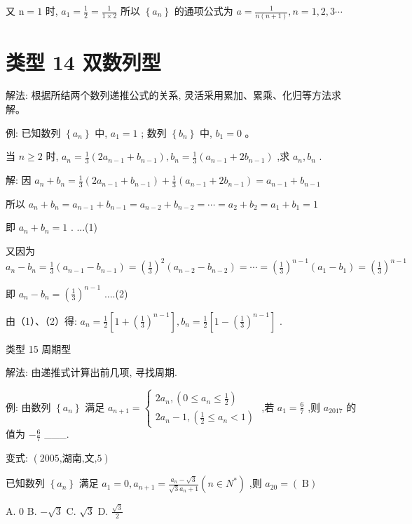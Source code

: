\documentclass[10pt,cn]{elegantbook}
\begin{document}
又 \(\mathrm{n} = 1\) 时, \({a}_{1} = \frac{1}{2} = \frac{1}{1 \times 2}\) 所以 \(\left\{ {a}_{n}\right\}\) 的通项公式为 \(a = \frac{1}{n\left( {n + 1}\right) },n = 1,2,3\cdots\)

\section*{类型 14 双数列型}

解法: 根据所结两个数列递推公式的关系, 灵活采用累加、累乘、化归等方法求解。

例: 已知数列 \(\left\{ {a}_{n}\right\}\) 中, \({a}_{1} = 1\) ; 数列 \(\left\{ {b}_{n}\right\}\) 中, \({b}_{1} = 0\) 。

当 \(n \geq 2\) 时, \({a}_{n} = \frac{1}{3}\left( {2{a}_{n - 1} + {b}_{n - 1}}\right) ,{b}_{n} = \frac{1}{3}\left( {{a}_{n - 1} + 2{b}_{n - 1}}\right)\) ,求 \({a}_{n},{b}_{n}\) .

解: 因 \({a}_{n} + {b}_{n} = \frac{1}{3}\left( {2{a}_{n - 1} + {b}_{n - 1}}\right) + \frac{1}{3}\left( {{a}_{n - 1} + 2{b}_{n - 1}}\right) = {a}_{n - 1} + {b}_{n - 1}\)

所以 \({a}_{n} + {b}_{n} = {a}_{n - 1} + {b}_{n - 1} = {a}_{n - 2} + {b}_{n - 2} = \cdots = {a}_{2} + {b}_{2} = {a}_{1} + {b}_{1} = 1\)

即 \({a}_{n} + {b}_{n} = 1\) . ...(1)

又因为 \({a}_{n} - {b}_{n} = \frac{1}{3}\left( {{a}_{n - 1} - {b}_{n - 1}}\right) = {\left( \frac{1}{3}\right) }^{2}\left( {{a}_{n - 2} - {b}_{n - 2}}\right) = \cdots = {\left( \frac{1}{3}\right) }^{n - 1}\left( {{a}_{1} - {b}_{1}}\right) = {\left( \frac{1}{3}\right) }^{n - 1}\)

即 \({a}_{n} - {b}_{n} = {\left( \frac{1}{3}\right) }^{n - 1}\) ....(2)

由（1）、（2）得: \({a}_{n} = \frac{1}{2}\left\lbrack {1 + {\left( \frac{1}{3}\right) }^{n - 1}}\right\rbrack ,{b}_{n} = \frac{1}{2}\left\lbrack {1 - {\left( \frac{1}{3}\right) }^{n - 1}}\right\rbrack\) .

类型 15 周期型

解法: 由递推式计算出前几项, 寻找周期.

例: 由数列 \(\left\{ {a}_{n}\right\}\) 满足 \({a}_{n + 1} = \left\{ \begin{array}{l} 2{a}_{n},\left( {0 \leq {a}_{n} \leq \frac{1}{2}}\right) \\ 2{a}_{n} - 1,\left( {\frac{1}{2} \leq {a}_{n} < 1}\right) \end{array}\right.\) ,若 \({a}_{1} = \frac{6}{7}\) ,则 \({a}_{2017}\) 的值为 \(- \frac{6}{7}\) \_\_\_.

变式: \(\left( {{2005}\text{,湖南,文,5}}\right)\)

已知数列 \(\left\{ {a}_{n}\right\}\) 满足 \({a}_{1} = 0,{a}_{n + 1} = \frac{{a}_{n} - \sqrt{3}}{\sqrt{3}{a}_{n} + 1}\left( {n \in {N}^{ * }}\right)\) ,则 \({a}_{20} = \left( \mathrm{\;B}\right)\)

A. 0 B. \(- \sqrt{3}\) C. \(\sqrt{3}\) D. \(\frac{\sqrt{3}}{2}\)
\end{document}
